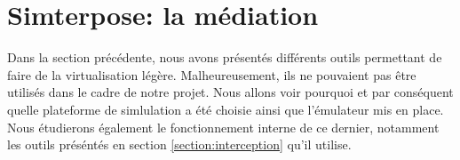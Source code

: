\section{Simterpose: la médiation}
\label{section:simterpose}

Dans la section précédente, nous avons présentés différents outils permettant de
faire de la virtualisation légère. Malheureusement, ils ne pouvaient pas être
utilisés dans le cadre de notre projet. Nous allons voir pourquoi et par
conséquent quelle plateforme de simlulation a été choisie ainsi que l'émulateur
mis en place. Nous étudierons également le fonctionnement interne de ce dernier,
notamment les outils préséntés en section \ref{section:interception} qu'il
utilise.
